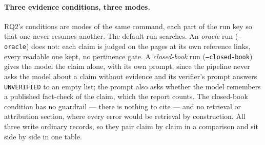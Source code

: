 \paragraph{Three evidence conditions, three modes.} RQ2's conditions
are modes of the same command, each part of the run key so that one
never resumes another. The default run searches. An \emph{oracle} run
(\texttt{--oracle}) does not: each claim is judged on the pages at its
own reference links, every readable one kept, no pertinence gate. A
\emph{closed-book} run (\texttt{--closed-book}) gives the model the claim
alone, with its own prompt, since the pipeline never asks the model
about a claim without evidence and its verifier's prompt answers
\texttt{UNVERIFIED} to an empty list; the prompt also asks whether the
model remembers a published fact-check of the claim, which the report
counts. The closed-book condition has no guardrail --- there is nothing
to cite --- and no retrieval or attribution section, where every error
would be retrieval by construction. All three write ordinary records,
so they pair claim by claim in a comparison and sit side by side in
one table.












